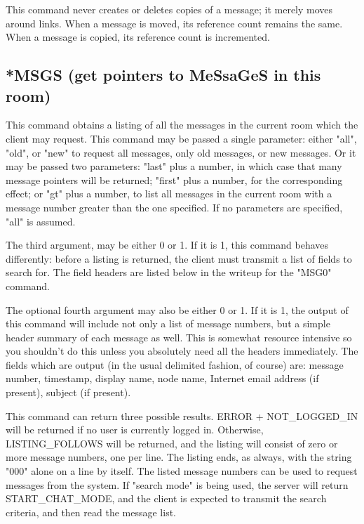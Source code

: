 This command never creates or deletes copies of a message; it merely moves
around links.  When a message is moved, its reference count remains the same.
When a message is copied, its reference count is incremented.




\subsection{*MSGS (get pointers to MeSsaGeS in this room)}

 This command obtains a listing of all the messages in the current room
which the client may request.  This command may be passed a single parameter:
either "all", "old", or "new" to request all messages, only old messages, or
new messages.  Or it may be passed two parameters: "last" plus a number, in
which case that many message pointers will be returned; "first" plus a
number, for the corresponding effect; or "gt" plus a number, to list all
messages in the current room with a message number greater than the one
specified.  If no parameters are specified, "all" is assumed.

 The third argument, may be either 0 or 1.  If it is 1, this command behaves
differently: before a listing is returned, the client must transmit a list
of fields to search for.  The field headers are listed below in the writeup
for the "MSG0" command.

 The optional fourth argument may also be either 0 or 1.  If it is 1, the
output of this command will include not only a list of message numbers, but
a simple header summary of each message as well.  This is somewhat resource
intensive so you shouldn't do this unless you absolutely need all the headers
immediately.  The fields which are output (in the usual delimited fashion, of
course) are: message number, timestamp, display name, node name, Internet
email address (if present), subject (if present).

 This command can return three possible results.  ERROR + NOT_LOGGED_IN will
be returned if no user is currently logged in.  Otherwise, LISTING_FOLLOWS
will be returned, and the listing will consist of zero or more message
numbers, one per line.  The listing ends, as always, with the string "000"
alone on a line by itself.  The listed message numbers can be used to request
messages from the system.  If "search mode" is being used, the server will
return START_CHAT_MODE, and the client is expected to transmit the search
criteria, and then read the message list.

